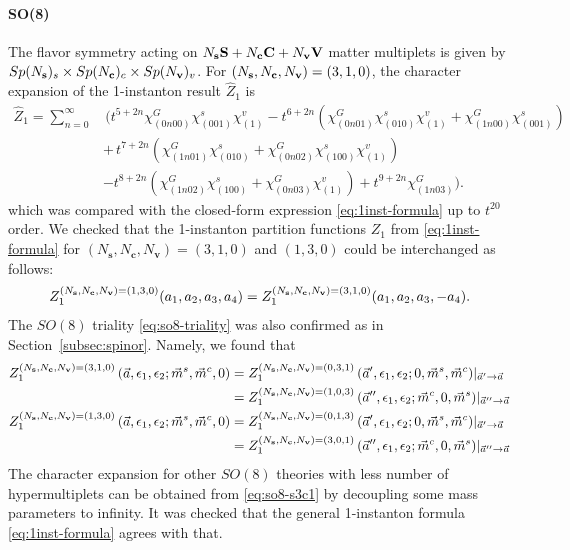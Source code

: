 \documentclass[letterpaper, 11pt]{article}
\newcommand{\nn}{\nonumber}
\begin{document}
{\paragraph{SO(8)} The flavor symmetry acting on $N_{\bf s} \mathbf{S} + N_{\bf c} \mathbf{C} + N_{\bf v} \mathbf{V}$ matter multiplets is given by $Sp(N_{\bf s})_s \times Sp(N_{\bf c})_c \times Sp(N_{\bf v})_v$. For $(N_{\bf s}, N_{\bf c}, N_{\bf v}) = (3,1,0)$, the character expansion of the 1-instanton result $\hat{Z}_1$ is 
\begin{align}
  \label{eq:so8-s3c1}
\hat{Z}_1=\sum_{n=0}^{\infty}&\,\Big(t^{5+2n}\chi^G_{(0n00)}\chi^s_{(001)}\chi^v_{(1)}-t^{6+2n}(\chi^G_{(0n01)}\chi^s_{(010)}\chi^v_{(1)}+\chi^G_{(1n00)}\chi^s_{(001)})\nn\\
&+\,t^{7+2n}(\chi^G_{(1n01)}\chi^s_{(010)}+\chi^G_{(0n02)}\chi^s_{(100)}\chi^v_{(1)})\\
&-t^{8+2n}(\chi^G_{(1n02)}\chi^s_{(100)}+\chi^G_{(0n03)}\chi^v_{(1)})+t^{9+2n}\chi^G_{(1n03)}\Big)\nn.
\end{align}
which was compared with the closed-form expression \eqref{eq:1inst-formula} up to $t^{20}$ order.
We checked that the 1-instanton partition functions ${Z}_1$ from \eqref{eq:1inst-formula} for $(N_\mathbf{s},N_\mathbf{c}, N_{\mathbf{v}})= (3,1,0)$ and $(1,3,0)$ could be interchanged as follows: 
\begin{align}
  Z_{1}^{(N_{\bf s}, N_{\bf c}, N_{\bf v}) = (1,3,0)}(a_1,a_2,a_3,a_4) = Z_{1}^{(N_{\bf s}, N_{\bf c}, N_{\bf v}) = (3,1,0)}(a_1,a_2,a_3,-a_4).
\end{align}
The $SO(8)$ triality \eqref{eq:so8-triality} was also confirmed as in Section~\ref{subsec:spinor}. Namely, we found that 
\begin{align}
  \begin{split}
  Z_1^{(N_{\bf s}, N_{\bf c}, N_{\bf v}) = (3,1,0)}\,(\vec{a}, \epsilon_1,\epsilon_2;\vec{m}^s,\vec{m}^c,0)  &= Z_1^{(N_{\bf s}, N_{\bf c}, N_{\bf v}) = (0,3,1)}\,(\vec{a}', \epsilon_1,\epsilon_2;0,\vec{m}^s,\vec{m}^c)|_{\vec{a}' \rightarrow \vec{a}}\\
  &= Z_1^{(N_{\bf s}, N_{\bf c}, N_{\bf v}) = (1,0,3)}\,(\vec{a}'', \epsilon_1,\epsilon_2;\vec{m}^c,0,\vec{m}^s)|_{\vec{a}'' \rightarrow \vec{a}}
  \end{split}\\
  \begin{split}
    Z_1^{(N_{\bf s}, N_{\bf c}, N_{\bf v}) = (1,3,0)}\,(\vec{a}, \epsilon_1,\epsilon_2;\vec{m}^s,\vec{m}^c,0)  &= Z_1^{(N_{\bf s}, N_{\bf c}, N_{\bf v}) = (0,1,3)}\,(\vec{a}', \epsilon_1,\epsilon_2;0,\vec{m}^s,\vec{m}^c)|_{\vec{a}' \rightarrow \vec{a}}\\
    &= Z_1^{(N_{\bf s}, N_{\bf c}, N_{\bf v}) = (3,0,1)}\,(\vec{a}'', \epsilon_1,\epsilon_2;\vec{m}^c,0,\vec{m}^s)|_{\vec{a}'' \rightarrow \vec{a}}
    \end{split}
\end{align}
The character expansion for other $SO(8)$ theories with less number of hypermultiplets can be obtained from \eqref{eq:so8-s3c1} by decoupling some mass parameters to infinity. It was checked that the general 1-instanton formula \eqref{eq:1inst-formula} agrees with that.



}
\end{document}
